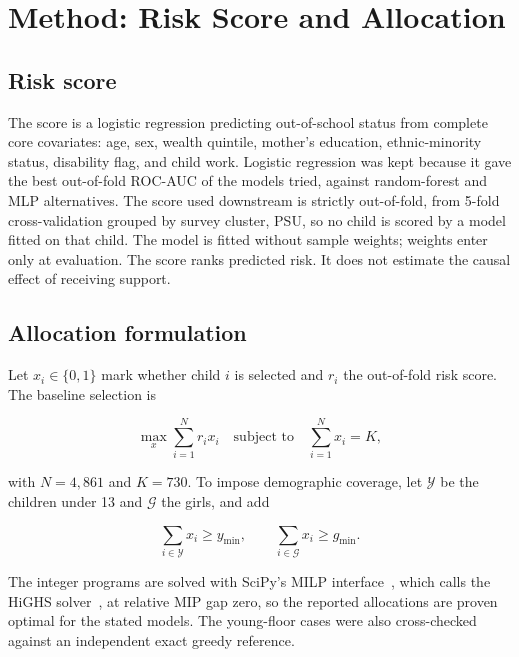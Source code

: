 \documentclass[12.1pt,a4paper]{article}
\begin{document}
\section{Method: Risk Score and Allocation}

\subsection{Risk score}

The score is a logistic regression predicting out-of-school status from complete core covariates: age, sex, wealth quintile, mother's education, ethnic-minority status, disability flag, and child work. Logistic regression was kept because it gave the best out-of-fold ROC-AUC of the models tried, against random-forest and MLP alternatives. The score used downstream is strictly out-of-fold, from 5-fold cross-validation grouped by survey cluster, PSU, so no child is scored by a model fitted on that child. The model is fitted without sample weights; weights enter only at evaluation. The score ranks predicted risk. It does not estimate the causal effect of receiving support.

\subsection{Allocation formulation}

Let $x_i \in \{0,1\}$ mark whether child $i$ is selected and $r_i$ the out-of-fold risk score. The baseline selection is

\begin{equation}
\max_{x} \sum_{i=1}^{N} r_i x_i
\quad \text{subject to} \quad
\sum_{i=1}^{N} x_i = K,
\end{equation}

with $N = 4{,}861$ and $K = 730$. To impose demographic coverage, let $\mathcal{Y}$ be the children under 13 and $\mathcal{G}$ the girls, and add

\begin{equation}
\sum_{i \in \mathcal{Y}} x_i \ge y_{\min},
\qquad
\sum_{i \in \mathcal{G}} x_i \ge g_{\min}.
\end{equation}

The integer programs are solved with SciPy's MILP interface~\cite{scipy}, which calls the HiGHS solver~\cite{highs}, at relative MIP gap zero, so the reported allocations are proven optimal for the stated models. The young-floor cases were also cross-checked against an independent exact greedy reference.
\end{document}
